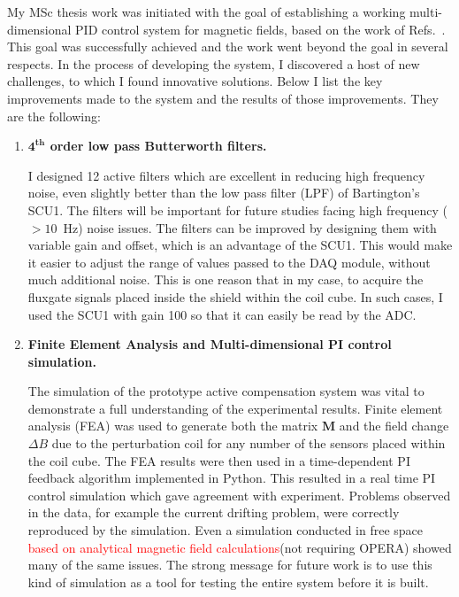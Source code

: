 My MSc thesis work was initiated with the goal of establishing a
working multi-dimensional PID control system for magnetic fields,
based on the work of Refs.~\cite{bea,lins}.  This goal was
successfully achieved and the work went beyond the goal in several
respects.  In the process of developing the system, I discovered a host
of new challenges, to which I found innovative solutions.  Below I
list the key improvements made to the system and the results of those
improvements.  They are the following:
\begin{enumerate}
\item {\bf $\mathbf{4^{th}}$ order low pass Butterworth filters.}  

I designed 12 active filters which are excellent in reducing high frequency noise, even slightly better than the low pass filter (LPF) of Bartington's SCU1. The filters will be important for future studies facing high frequency ($>10$~Hz) noise issues. The filters can be improved by designing them with variable gain and offset, which is an advantage of the SCU1. This would make it easier to adjust the range of values passed to the DAQ module, without much additional noise. This is one reason that in my case, to acquire the fluxgate signals placed inside the shield within the coil cube. In such cases, I used the SCU1 with gain 100 so that it can easily be read by the ADC.  

\item {\bf Finite Element Analysis and Multi-dimensional PI control simulation.}  

The simulation of the prototype active compensation system was vital to demonstrate a full understanding of the experimental results. Finite element analysis (FEA) was used to generate both the matrix $\bm{M}$ and the field change $\Delta B$ due to the perturbation coil for any number of the sensors placed within the coil cube. The FEA results were then used in a time-dependent PI feedback algorithm implemented in Python. This resulted in a real time PI control simulation which gave agreement with experiment. Problems observed in the data, for example the current drifting problem, were correctly reproduced by the simulation. Even a simulation conducted in free space \textcolor{red}{based on analytical magnetic field calculations}(not requiring OPERA) showed many of the same issues. The strong message for future work is to use this kind of simulation as a tool for testing the entire system before it is built.



\end{enumerate}

